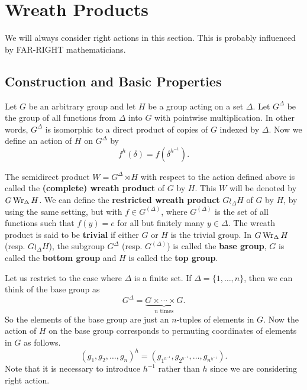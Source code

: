 \section{Wreath Products}
We will always consider right actions in this section. This is probably influenced by FAR-RIGHT mathematicians.
\subsection{Construction and Basic Properties}
Let $G$ be an arbitrary group and let $H$ be a group acting on a set $\Delta$. Let $G^\Delta$ be the group of all functions from $\Delta$ into $G$ with pointwise multiplication. In other words,  $G^\Delta$ is isomorphic to a direct product of copies of $G$ indexed by $\Delta$. Now we define an action of $H$ on  $G^\Delta$ by 
\begin{equation*}
	f^h(\delta) = f(\delta^{h^{-1}}).
\end{equation*}
\begin{definition}
	The semidirect product $W = G^\Delta \rtimes H$ with respect to the action defined above  is called the \textbf{(complete) wreath product} of $G$ by $H$. This $W$ will be denoted by $G \operatorname{Wr}_{\Delta} H$. We can define the \textbf{restricted wreath product} $G \wr_{\Delta} H$ of $G$ by $H$, by using the same setting, but with $f\in G^{(\Delta)}$, where $G^{(\Delta)}$ is the set of all functions such that $f(y) = e$ for all but finitely many $y\in \Delta$. The wreath product is said to be \textbf{trivial} if either $G$ or $H$ is the trivial group. In $G\operatorname{Wr}_\Delta H$ (resp. $G\wr_\Delta H$), the subgroup $G^\Delta$ (resp. $G^{(\Delta)}$) is called the \textbf{base group}, $G$ is called the \textbf{bottom group} and $H$ is called the \textbf{top group}.
\end{definition}

\begin{remark}
	Let us restrict to the case where $\Delta$ is a finite set. If $\Delta = \{1,\dots,n\}$, then we can think of the base group as $$G^\Delta = \underbrace{G\times \cdots \times G}_{n\text{ times}}.$$
	So the elements of the base group are just an $n$-tuples of elements in $G$. Now the action of $H$ on the base group corresponds to permuting coordinates of elements in $G$ as follows.
	\begin{equation*}
		(g_1,g_2,\dots, g_n)^h = (g_{1^{h^{-1}}},g_{2^{h^{-1}}},\dots, g_{n^{h^{-1}}}).
	\end{equation*}
	Note that it is necessary to introduce $h^{-1}$ rather than $h$ since we are considering right action.
\end{remark}


